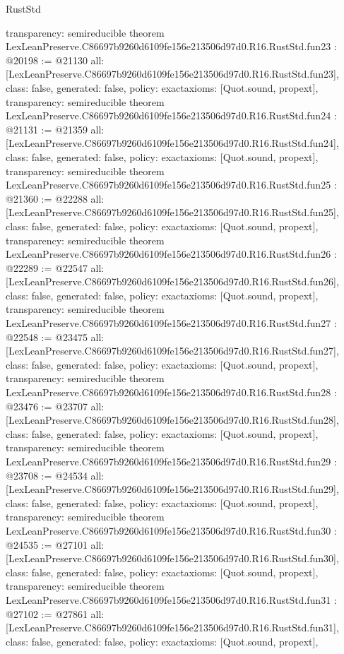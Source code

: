 \begin{lexlean}{RustStd}
\begin{coremodule}
{  transparency: semireducible
}
theorem LexLeanPreserve.C86697b9260d6109fe156e213506d97d0.R16.RustStd.fun23 : @20198 := @21130 {
  all: [LexLeanPreserve.C86697b9260d6109fe156e213506d97d0.R16.RustStd.fun23],
  class: false,
  generated: false,
  policy: exact{axioms: [Quot.sound, propext]},
  transparency: semireducible
}
theorem LexLeanPreserve.C86697b9260d6109fe156e213506d97d0.R16.RustStd.fun24 : @21131 := @21359 {
  all: [LexLeanPreserve.C86697b9260d6109fe156e213506d97d0.R16.RustStd.fun24],
  class: false,
  generated: false,
  policy: exact{axioms: [Quot.sound, propext]},
  transparency: semireducible
}
theorem LexLeanPreserve.C86697b9260d6109fe156e213506d97d0.R16.RustStd.fun25 : @21360 := @22288 {
  all: [LexLeanPreserve.C86697b9260d6109fe156e213506d97d0.R16.RustStd.fun25],
  class: false,
  generated: false,
  policy: exact{axioms: [Quot.sound, propext]},
  transparency: semireducible
}
theorem LexLeanPreserve.C86697b9260d6109fe156e213506d97d0.R16.RustStd.fun26 : @22289 := @22547 {
  all: [LexLeanPreserve.C86697b9260d6109fe156e213506d97d0.R16.RustStd.fun26],
  class: false,
  generated: false,
  policy: exact{axioms: [Quot.sound, propext]},
  transparency: semireducible
}
theorem LexLeanPreserve.C86697b9260d6109fe156e213506d97d0.R16.RustStd.fun27 : @22548 := @23475 {
  all: [LexLeanPreserve.C86697b9260d6109fe156e213506d97d0.R16.RustStd.fun27],
  class: false,
  generated: false,
  policy: exact{axioms: [Quot.sound, propext]},
  transparency: semireducible
}
theorem LexLeanPreserve.C86697b9260d6109fe156e213506d97d0.R16.RustStd.fun28 : @23476 := @23707 {
  all: [LexLeanPreserve.C86697b9260d6109fe156e213506d97d0.R16.RustStd.fun28],
  class: false,
  generated: false,
  policy: exact{axioms: [Quot.sound, propext]},
  transparency: semireducible
}
theorem LexLeanPreserve.C86697b9260d6109fe156e213506d97d0.R16.RustStd.fun29 : @23708 := @24534 {
  all: [LexLeanPreserve.C86697b9260d6109fe156e213506d97d0.R16.RustStd.fun29],
  class: false,
  generated: false,
  policy: exact{axioms: [Quot.sound, propext]},
  transparency: semireducible
}
theorem LexLeanPreserve.C86697b9260d6109fe156e213506d97d0.R16.RustStd.fun30 : @24535 := @27101 {
  all: [LexLeanPreserve.C86697b9260d6109fe156e213506d97d0.R16.RustStd.fun30],
  class: false,
  generated: false,
  policy: exact{axioms: [Quot.sound, propext]},
  transparency: semireducible
}
theorem LexLeanPreserve.C86697b9260d6109fe156e213506d97d0.R16.RustStd.fun31 : @27102 := @27861 {
  all: [LexLeanPreserve.C86697b9260d6109fe156e213506d97d0.R16.RustStd.fun31],
  class: false,
  generated: false,
  policy: exact{axioms: [Quot.sound, propext]},
}
\end{coremodule}
\end{lexlean}

